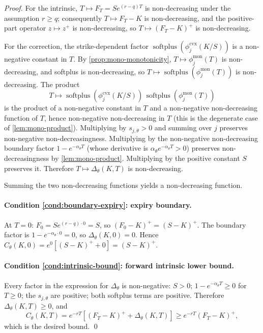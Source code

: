 \documentclass[largeformat]{interact}
\theoremstyle{plain}
\theoremstyle{definition}
\DeclareMathOperator{\softplus}{softplus}
\begin{document}
\begin{proof}
For the intrinsic, $T \mapsto F_T = Se^{(r-q)T}$ is non-decreasing under the assumption $r \geq q$; consequently $T \mapsto F_T - K$ is non-decreasing, and the positive-part operator $z \mapsto z^+$ is non-decreasing, so $T \mapsto (F_T - K)^+$ is non-decreasing.

For the correction, the strike-dependent factor $\softplus(\phi^{\mathrm{cvx}}_j(K/S))$ is a non-negative constant in $T$. By \cref{prop:mono-monotonicity}, $T \mapsto \phi^{\mathrm{mon}}_j(T)$ is non-decreasing, and softplus is non-decreasing, so $T \mapsto \softplus(\phi^{\mathrm{mon}}_j(T))$ is non-decreasing. The product
\[
T \mapsto \softplus(\phi^{\mathrm{cvx}}_j(K/S))\,\softplus(\phi^{\mathrm{mon}}_j(T))
\]
is the product of a non-negative constant in $T$ and a non-negative non-decreasing function of $T$, hence non-negative non-decreasing in $T$ (this is the degenerate case of \cref{lem:mono-product}). Multiplying by $s_{j,\theta} > 0$ and summing over $j$ preserves non-negative non-decreasingness. Multiplying by the non-negative non-decreasing boundary factor $1 - e^{-\alpha_\theta T}$ (whose derivative is $\alpha_\theta e^{-\alpha_\theta T} > 0$) preserves non-decreasingness by \cref{lem:mono-product}. Multiplying by the positive constant $S$ preserves it. Therefore $T \mapsto \Delta_\theta(K, T)$ is non-decreasing.

Summing the two non-decreasing functions yields a non-decreasing function.

\paragraph{Condition \ref{cond:boundary-expiry}: expiry boundary.}
At $T = 0$: $F_0 = Se^{(r-q)\cdot 0} = S$, so $(F_0 - K)^+ = (S - K)^+$. The boundary factor is $1 - e^{-\alpha_\theta \cdot 0} = 0$, so $\Delta_\theta(K, 0) = 0$. Hence $C_\theta(K, 0) = e^{0}[(S - K)^+ + 0] = (S - K)^+$.

\paragraph{Condition \ref{cond:intrinsic-bound}: forward intrinsic lower bound.}
Every factor in the expression for $\Delta_\theta$ is non-negative: $S > 0$; $1 - e^{-\alpha_\theta T} \geq 0$ for $T \geq 0$; the $s_{j,\theta}$ are positive; both softplus terms are positive. Therefore $\Delta_\theta(K, T) \geq 0$, and
\[
C_\theta(K, T) = e^{-rT}[(F_T - K)^+ + \Delta_\theta(K, T)] \geq e^{-rT}(F_T - K)^+,
\]
which is the desired bound.
\qed
\end{proof}
\end{document}
